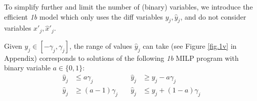 	

	To simplify further and limit the number of (binary) variables, 
    we introduce the efficient {\em 1b} model which only uses the diff variables $y_j,\hat{y}_j$, and do not consider variables $x'_j,\hat{x}'_j$. 
    

    \begin{proposition}
    \label{prop3}
    Given $y_j \in [-\gamma_j,\gamma_j]$, 
the range of values $\hat{y}_j$ can take (see Figure \ref{fig.1v} in Appendix) corresponds to solutions of the following {\em 1b} MILP program with binary variable $a \in \{0,1\}$:
	\begin{align*}
		\hat{y}_j &\leq a \gamma_j               &\quad \hat{y}_j &\geq y_j - a \gamma_j \\
		\hat{y}_j &\geq (a-1) \gamma_j           &\quad \hat{y}_j &\leq y_j + (1-a) \gamma_j
	\end{align*} 
	\end{proposition}

